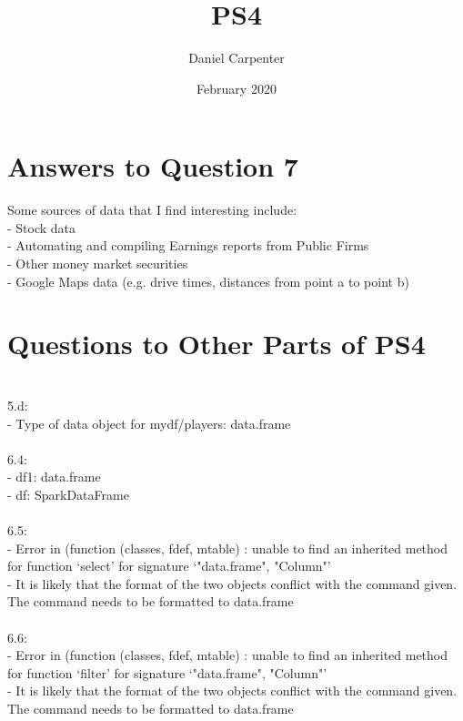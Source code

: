 \documentclass{article}
\title{PS4}
\author{Daniel Carpenter}
\date{February 2020}
\begin{document}
\maketitle

\section{Answers to Question 7}
    Some sources of data that I find interesting include: 
    \\ - Stock data
    \\ - Automating and compiling Earnings reports from Public Firms
    \\ - Other money market securities
    \\ - Google Maps data (e.g. drive times, distances from point a to point b)
\\
\section{Questions to Other Parts of PS4}
     \\ 5.d: 
     \\ - Type of data object for mydf/players: data.frame
     \\
     \\ 6.4:
     \\ - df1: data.frame
     \\ - df: SparkDataFrame
     \\
     \\ 6.5:
         \\ - Error in (function (classes, fdef, mtable)  :  unable to find an inherited method for function ‘select’ for signature ‘"data.frame", "Column"’
         \\ - It is likely that the format of the two objects conflict with the command given. The command needs to be formatted to data.frame
     \\
     \\ 6.6:
        \\ - Error in (function (classes, fdef, mtable)  :  unable to find an inherited method for function ‘filter’ for signature ‘"data.frame", "Column"’
        \\ - It is likely that the format of the two objects conflict with the command given. The command needs to be formatted to data.frame
\end{document}
